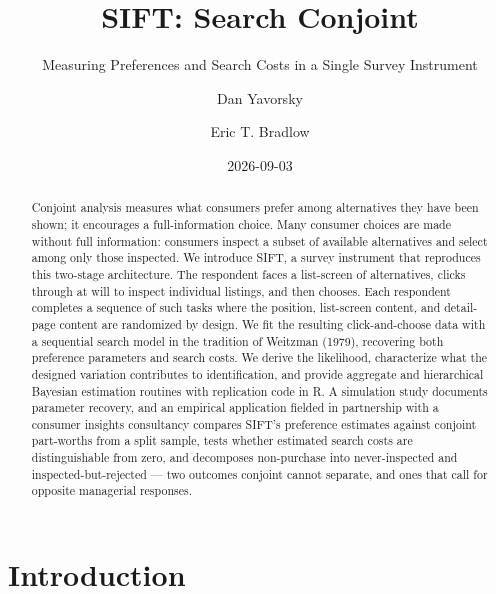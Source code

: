 \documentclass[
  letterpaper,
  DIV=11,
  numbers=noendperiod]{scrartcl}
\title{SIFT: Search Conjoint}
\subtitle{Measuring Preferences and Search Costs in a Single Survey
Instrument}
\author{Dan Yavorsky \and Eric T. Bradlow}
\date{2026-09-03}
\begin{document}
\maketitle
\begin{abstract}
Conjoint analysis measures what consumers prefer among alternatives they
have been shown; it encourages a full-information choice. Many consumer
choices are made without full information: consumers inspect a subset of
available alternatives and select among only those inspected. We
introduce SIFT, a survey instrument that reproduces this two-stage
architecture. The respondent faces a list-screen of alternatives, clicks
through at will to inspect individual listings, and then chooses. Each
respondent completes a sequence of such tasks where the position,
list-screen content, and detail-page content are randomized by design.
We fit the resulting click-and-choose data with a sequential search
model in the tradition of Weitzman (1979), recovering both preference
parameters and search costs. We derive the likelihood, characterize what
the designed variation contributes to identification, and provide
aggregate and hierarchical Bayesian estimation routines with replication
code in R. A simulation study documents parameter recovery, and an
empirical application fielded in partnership with a consumer insights
consultancy compares SIFT's preference estimates against conjoint
part-worths from a split sample, tests whether estimated search costs
are distinguishable from zero, and decomposes non-purchase into
never-inspected and inspected-but-rejected --- two outcomes conjoint
cannot separate, and ones that call for opposite managerial responses.
\end{abstract}


  \newcommand{\iid}{\stackrel{iid}{\sim}}
  \newcommand{\bfbeta}{\boldsymbol{\beta}}
  \newcommand{\bfgamma}{\boldsymbol{\gamma}}
  \newcommand{\bfkappa}{\boldsymbol{\kappa}}
  \newcommand{\bfeta}{\boldsymbol{\eta}}
  \newcommand{\bftheta}{\boldsymbol{\theta}}
  \newcommand{\bfOmega}{\boldsymbol{\Omega}}
  \newcommand{\bfX}{\mathbf{X}}
  \newcommand{\bfL}{\mathbf{L}}
  \newcommand{\bfZ}{\mathbf{Z}}
  \newcommand{\Jset}{\mathcal{J}}
  \newcommand{\Sset}{\mathcal{S}}
  \newcommand{\Sbar}{\bar{\mathcal{S}}}
  \newcommand{\resv}{z}
  \newcommand{\cost}{c}

\section{Introduction}\label{sec-intro}
\end{document}
